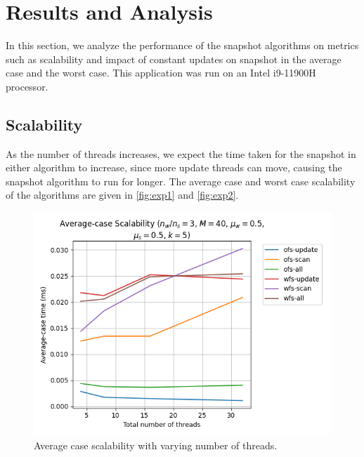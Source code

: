 \documentclass[conference,compsoc]{IEEEtran}
\begin{document}
\section{Results and Analysis}
\label{sec:results}

In this section, we analyze the performance of the snapshot algorithms on
metrics such as scalability and impact of constant updates on snapshot in the
average case and the worst case. This application was run on an Intel i9-11900H
processor.

\subsection{Scalability}
\label{subsec:scalability}

As the number of threads increases, we expect the time taken for the snapshot in
either algorithm to increase, since more update threads can move, causing the
snapshot algorithm to run for longer. The average case and worst case
scalability of the algorithms are given in \autoref{fig:exp1} and
\autoref{fig:exp2}.

\begin{figure}[!ht]
    \centering
    \includegraphics[width=\columnwidth]{images/exp1.png} 
    \caption{Average case scalability with varying number of threads.}
    \label{fig:exp1}
\end{figure}
\end{document}
